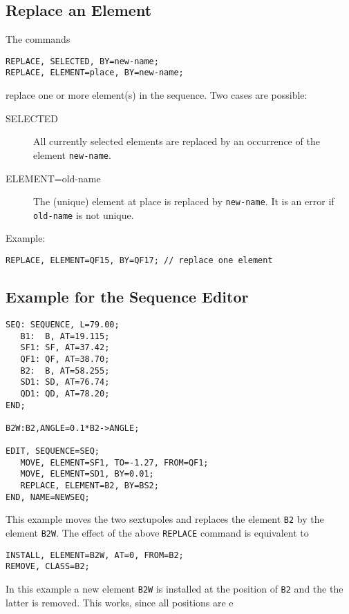 \subsection{Replace an Element}
\label{sec:editreplace}
The commands
\begin{verbatim}
REPLACE, SELECTED, BY=new-name;
REPLACE, ELEMENT=place, BY=new-name;
\end{verbatim}
replace one or more element(s) in the sequence.
Two cases are possible:
\begin{description}
\item[SELECTED]
  All currently selected elements are replaced by an occurrence of the
  element \texttt{new-name}.
\item[ELEMENT=old-name]
  The (unique) element at {place}  is replaced
  by \texttt{new-name}.
  It is an error if \texttt{old-name} is not unique.
\end{description}
Example:
\begin{verbatim}
REPLACE, ELEMENT=QF15, BY=QF17; // replace one element
\end{verbatim}

\subsection{Example for the Sequence Editor}
\label{sec:editxmpl}
\begin{verbatim}
SEQ: SEQUENCE, L=79.00;
   B1:  B, AT=19.115;
   SF1: SF, AT=37.42;
   QF1: QF, AT=38.70;
   B2:  B, AT=58.255;
   SD1: SD, AT=76.74;
   QD1: QD, AT=78.20;
END;

B2W:B2,ANGLE=0.1*B2->ANGLE;

EDIT, SEQUENCE=SEQ;
   MOVE, ELEMENT=SF1, TO=-1.27, FROM=QF1;
   MOVE, ELEMENT=SD1, BY=0.01;
   REPLACE, ELEMENT=B2, BY=BS2;
END, NAME=NEWSEQ;
\end{verbatim}
This example moves the two sextupoles and replaces the element \texttt{B2}
by the element \texttt{B2W}.
The effect of the above \texttt{REPLACE} command is equivalent to
\begin{verbatim}
INSTALL, ELEMENT=B2W, AT=0, FROM=B2;
REMOVE, CLASS=B2;
\end{verbatim}
In this example a new element \texttt{B2W} is installed at the position
of \texttt{B2} and the the latter is removed.
This works, since all positions are e


\clearpage
